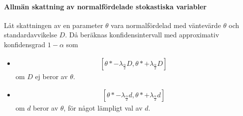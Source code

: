 \paragraph{Allmän skattning av normalfördelade stokastiska variabler}
Låt skattningen av en parameter $\theta$ vara normalfördelad med väntevärde $\theta$ och standardavvikelse $D$. Då beräknas konfidensintervall med approximativ konfidensgrad $1 - \alpha$ som
\begin{itemize}
	\item
	\begin{align*}
		\left[\theta* - \lambda_{\frac{\alpha}{2}}D, \theta* + \lambda_{\frac{\alpha}{2}}D\right]
	\end{align*}
	om $D$ ej beror av $\theta$.
	
	\item
	\begin{align*}
		\left[\theta* - \lambda_{\frac{\alpha}{2}}d, \theta* + \lambda_{\frac{\alpha}{2}}d\right]
	\end{align*}
	om $d$ beror av $\theta$, för något lämpligt val av $d$.
\end{itemize}